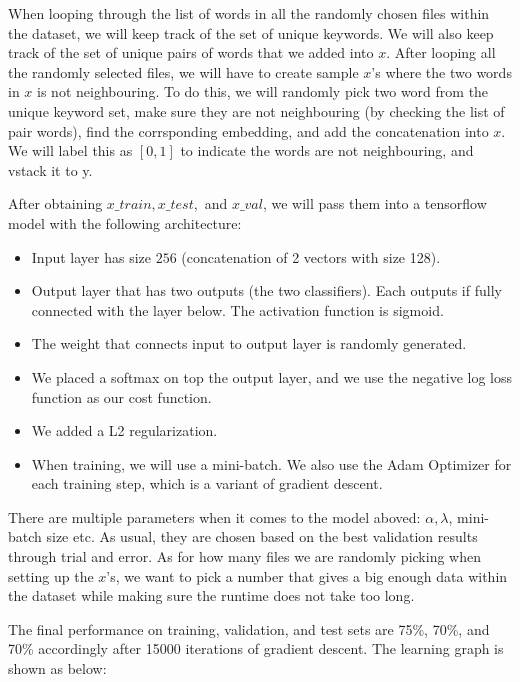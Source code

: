 \documentclass[11pt,twoside]{article}
\begin{document}
When looping through the list of words in all the randomly chosen files within the dataset, we will keep track of the set of unique keywords. We will also keep track of the set of unique pairs of words that we added into $x$. After looping all the randomly selected files, we will have to create sample $x$'s where the two words in $x$ is not neighbouring. To do this, we will randomly pick two word from the unique keyword set, make sure they are not neighbouring (by checking the list of pair words), find the corrsponding embedding, and add the concatenation into $x$. We will label this as $[0, 1]$ to indicate the words are not neighbouring, and vstack it to y.

After obtaining $x\_train, x\_test,$ and $x\_val$, we will pass them into a tensorflow model with the following architecture:
\begin {itemize}
	\item Input layer has size $256$ (concatenation of 2 vectors with size 128).
	\item Output layer that has two outputs (the two classifiers). Each outputs if fully connected with the layer below. The activation function is sigmoid.
	\item The weight that connects input to output layer is randomly generated.
	\item We placed a softmax on top the output layer, and we use the negative log loss function as our cost function.
	\item We added a L2 regularization.
	\item When training, we will use a mini-batch. We also use the Adam Optimizer for each training step, which is a variant of gradient descent.
\end {itemize}

There are multiple parameters when it comes to the model aboved: $\alpha, \lambda$, mini-batch size etc. As usual, they are chosen based on the best validation results through trial and error. As for how many files we are randomly picking when setting up the $x$'s, we want to pick a number that gives a big enough data within the dataset while making sure the runtime does not take too long.

The final performance on training, validation, and test sets are 75\%, 70\%, and 70\% accordingly after 15000 iterations of gradient descent. The learning graph is shown as below:
\end{document}
